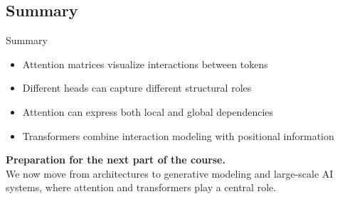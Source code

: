 \documentclass[aspectratio=169,11pt]{beamer}
\begin{document}
\subsection{Summary}
\begin{frame}[t,allowframebreaks]{Summary}
\small
\begin{itemize}
    \item Attention matrices visualize interactions between tokens
    \item Different heads can capture different structural roles
    \item Attention can express both local and global dependencies
    \item Transformers combine interaction modeling with positional information
\end{itemize}

\textbf{Preparation for the next part of the course.}\\ We now move from architectures to generative modeling and large-scale AI systems, where attention and transformers play a central role.
\end{frame}
\end{document}
